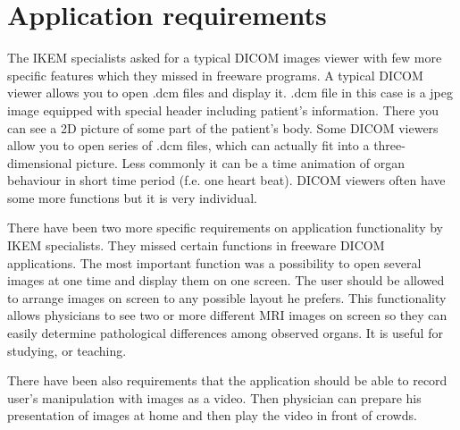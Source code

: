 \section*{Application requirements}
The IKEM specialists asked for a typical DICOM images viewer with few more specific features which they missed in freeware programs. A typical DICOM viewer allows you to open .dcm files and display it. .dcm file in this case is a jpeg image equipped with special header including patient's information. There you can see a 2D picture of some part of the patient's body. Some DICOM viewers allow you to open series of .dcm files, which can actually fit into a three-dimensional picture. Less commonly it can be a time animation of organ behaviour in short time period (f.e. one heart beat). DICOM viewers often have some more functions but it is very individual.

There have been two more specific requirements on application functionality by IKEM specialists. They missed certain functions in freeware DICOM applications. The most important function was a possibility to open several images at one time and display them on one screen. The user should be allowed to arrange images on screen to any possible layout he prefers. This functionality allows physicians to see two or more different MRI images on screen so they can easily determine pathological differences among observed organs. It is useful for studying, or teaching.

There have been also requirements that the application should be able to record user's manipulation with images as a video. Then physician can prepare his presentation of images at home and then play the video in front of crowds.

